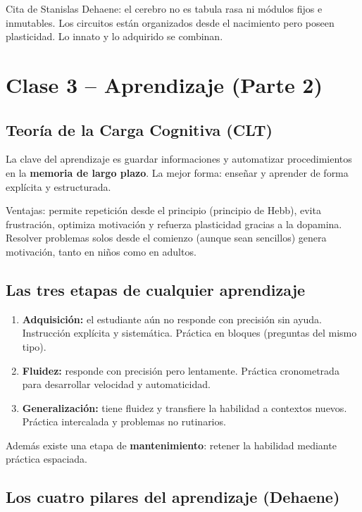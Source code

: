 \documentclass[11pt, a4paper]{article}
\begin{document}
Cita de Stanislas Dehaene: el cerebro no es tabula rasa ni m\'odulos fijos e inmutables. Los circuitos est\'an organizados desde el nacimiento pero poseen plasticidad. Lo innato y lo adquirido se combinan.

\section{Clase 3 -- Aprendizaje (Parte 2)}

\subsection{Teor\'ia de la Carga Cognitiva (CLT)}

La clave del aprendizaje es guardar informaciones y automatizar procedimientos en la \textbf{memoria de largo plazo}. La mejor forma: ense\~nar y aprender de forma expl\'icita y estructurada.

Ventajas: permite repetici\'on desde el principio (principio de Hebb), evita frustraci\'on, optimiza motivaci\'on y refuerza plasticidad gracias a la dopamina. Resolver problemas solos desde el comienzo (aunque sean sencillos) genera motivaci\'on, tanto en ni\~nos como en adultos.

\subsection{Las tres etapas de cualquier aprendizaje}

\begin{enumerate}[nosep]
    \item \textbf{Adquisici\'on:} el estudiante a\'un no responde con precisi\'on sin ayuda. Instrucci\'on expl\'icita y sistem\'atica. Pr\'actica en bloques (preguntas del mismo tipo).
    \item \textbf{Fluidez:} responde con precisi\'on pero lentamente. Pr\'actica cronometrada para desarrollar velocidad y automaticidad.
    \item \textbf{Generalizaci\'on:} tiene fluidez y transfiere la habilidad a contextos nuevos. Pr\'actica intercalada y problemas no rutinarios.
\end{enumerate}
Adem\'as existe una etapa de \textbf{mantenimiento}: retener la habilidad mediante pr\'actica espaciada.

\subsection{Los cuatro pilares del aprendizaje (Dehaene)}
\end{document}
